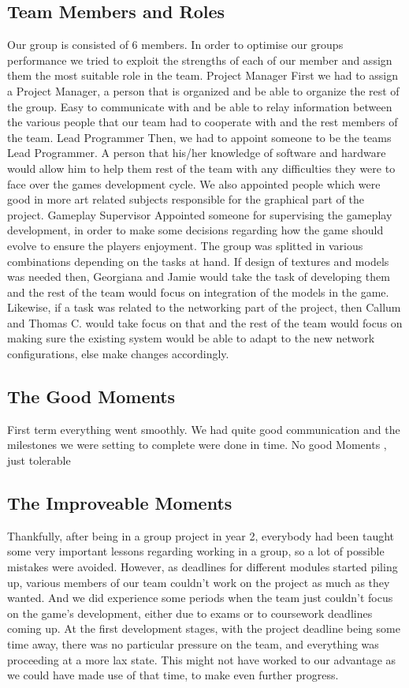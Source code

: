 \documentclass[11pt,a4paper]{article}
\begin{document}
        \subsection{Team Members and Roles}
        Our group is consisted of 6 members. In order to optimise our groups performance we tried to exploit the strengths of each of our member and assign them the most suitable role in the team. 
        Project Manager
        First we had to assign a Project Manager, a person that is organized and be able to organize the rest of the group. Easy to communicate with and be able to relay information between the various people that our team had to cooperate with and the rest members of the team. 
        Lead Programmer
        Then, we had to appoint someone to be the teams Lead Programmer. A person that his/her knowledge of software and hardware would allow him to help them rest of the team with any difficulties they were to face over the games development cycle. We also appointed people which were good in more art related subjects responsible for the graphical part of the project.
        Gameplay Supervisor
        Appointed someone for supervising the gameplay development, in order to make some decisions regarding how the game should evolve to ensure the players enjoyment. 
        The group was splitted in various combinations depending on the tasks at hand. If design of textures and models was needed then, Georgiana and Jamie would take the task of developing them and the rest of the team would focus on integration of the models in the game. Likewise, if a task was related to the networking part of the project, then Callum and Thomas C. would take focus on that and the rest of the team would focus on making sure the existing system would be able to adapt to the new network configurations, else make changes accordingly.
         
        \subsection{The Good Moments}
        First term everything went smoothly. We had quite good communication and the milestones we were setting to complete were done in time. No good Moments , just tolerable


        \subsection{The Improveable Moments}
        Thankfully, after being in a group project in year 2, everybody had been taught some very important lessons regarding working in a group, so a lot of possible mistakes were avoided.
        However, as deadlines for different modules started piling up, various members of our team couldn't work on the project as much as they wanted. And we did experience some periods when the team just couldn't focus on the game's development, either due to exams or to coursework deadlines coming up.
        At the first development stages, with the project deadline being some time away, there was no particular pressure on the team, and everything was proceeding at a more lax state. This might not have worked to our advantage as we could have made use of that time, to make even further progress.  
\end{document}
